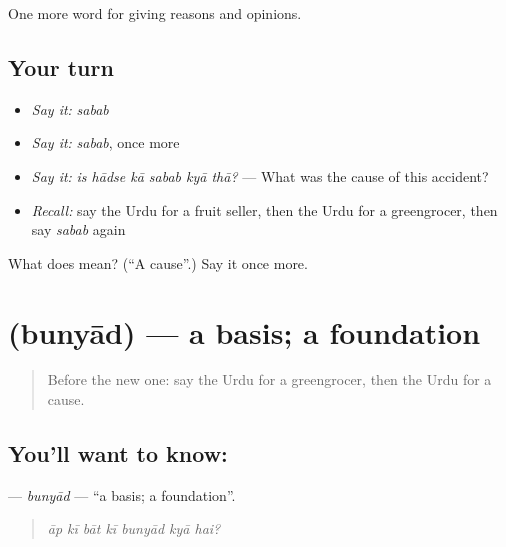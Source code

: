\begin{grammarlens}[title={What you've built}]
One more word for giving reasons and opinions.
\end{grammarlens}

\subsection*{Your turn}
\begin{itemize}
\raggedright
  \item \emph{Say it:} \emph{sabab}
  \item \emph{Say it:} \emph{sabab}, once more
  \item \emph{Say it:} \emph{is hādse kā sabab kyā thā?} — What was the cause of this accident?
  \item \emph{Recall:} say the Urdu for a fruit seller, then the Urdu for a greengrocer, then say \emph{sabab} again
\end{itemize}

\begin{tcolorbox}[breakable,colback=teal!4,colframe=teal!35!black,title={Before you move on}]
What does  mean? (\textquotedblleft{}A cause\textquotedblright{}.) Say it once more.
\end{tcolorbox}
\section[\texorpdfstring{\ur{بنیاد} (bunyād)}{بنیاد (bunyād)}]{ (bunyād) — a basis; a foundation}

\label{lesson:UR-C331-bunyad}



\begin{quote}
Before the new one: say the Urdu for a greengrocer, then the Urdu for a cause.
\end{quote}

\subsection*{You'll want to know: }
\textbf{} — \emph{bunyād} — \textquotedblleft{}a basis; a foundation\textquotedblright{}.

\begin{quote}
      
\end{quote}

\begin{quote}
\emph{āp kī bāt kī bunyād kyā hai?}
\end{quote}


